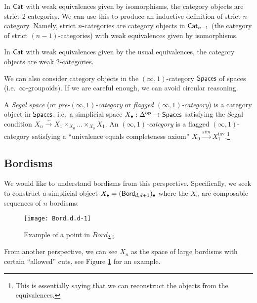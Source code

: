 \begin{ex}
	In $\mathsf{Cat}$ with weak equivalences given by isomorphisms, the category objects are strict 2-categories.
	We can use this to produce an inductive definition of strict $n$-category.
	Namely, strict $n$-categories are category objects in $\mathsf{Cat}_{n-1}$ (the category of strict $(n-1)$-categories) with weak equivalences given by isomorphisms.
\end{ex}

\begin{ex}
	In $\mathsf{Cat}$ with weak equivalences given by the usual equivalences, the category objects are weak 2-categories.
\end{ex}

We can also consider category objects in the $(\infty, 1)$-category $\mathsf{Spaces}$ of spaces (i.e.\ $\infty$-groupoids).
If we are careful enough, we can avoid circular reasoning.

\begin{dfn}
	A \emph{Segal space} (or \emph{pre-$(\infty, 1)$-category} or \emph{flagged $(\infty, 1)$-category}) is a category object in $\mathsf{Spaces}$, i.e.\ a simplicial space $X_\bullet: \Delta^{\mathrm{op}} \to \mathsf{Spaces}$ satisfying the Segal condition $X_n \xrightarrow{\sim} X_1 \times_{X_0} \dots \times_{X_0} X_1$.
	An \emph{$(\infty, 1)$-category} is a flagged $(\infty, 1)$-category satisfying a ``univalence equals completeness axiom'' $X_0 \xrightarrow{sim} X_1^{\textrm{inv}}$.\footnote{This is essentially saying that we can reconstruct the objects from the equivalences.}
\end{dfn}

\subsection{Bordisms}

We would like to understand bordisms from this perspective.
Specifically, we seek to construct a simplicial object $X_\bullet = (\mathsf{Bord}_{d,d+1})_\bullet$ where the $X_n$ are composable sequences of $n$ bordisms.
\begin{figure}[h]
\centering
\texttt{[image: Bord.d.d-1]}
\caption{Example of a point in $Bord_{2,3}$}
\label{fig:Bord.d.d+1}
\end{figure}

From another perspective, we can see $X_n$ as the space of large bordisms with certain ``allowed'' cuts, see Figure \ref{fig:Bord.d.d+1} for an example.

